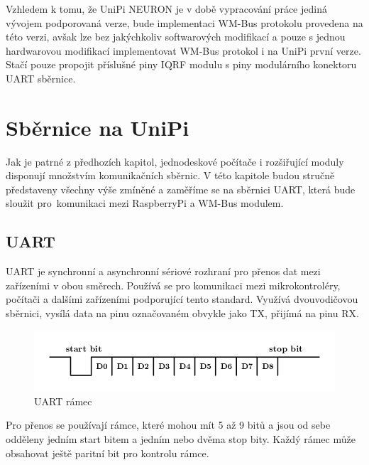 \vspace{10pt}
Vzhledem k tomu, že UniPi NEURON je v době vypracování práce jediná vývojem podporovaná verze, bude implementaci WM-Bus protokolu provedena na této verzi, avšak lze bez jakýchkoliv softwarových modifikací a pouze s jednou hardwarovou modifikací implementovat WM-Bus protokol i na UniPi první verze. Stačí pouze propojit příslušné piny IQRF modulu s piny modulárního konektoru UART sběrnice.



\section{Sběrnice na UniPi}
Jak je patrné z předhozích kapitol, jednodeskové počítače i rozšiřující moduly disponují množstvím komunikačních sběrnic. V této kapitole budou stručně představeny všechny výše zmíněné a zaměříme se na sběrnici UART, která bude sloužit pro~komunikaci mezi RaspberryPi a WM-Bus modulem.

\subsection{UART}
UART je synchronní a asynchronní sériové rozhraní pro přenos dat mezi zařízeními v obou směrech. Používá se pro komunikaci mezi mikrokontroléry, počítači a dalšími zařízeními podporující tento standard. Využívá dvouvodičovou sběrnici, vysílá data na pinu označovaném obvykle jako TX, přijímá na pinu RX.

 \begin{figure}[!ht]
	\vspace{-10pt}
  \begin{center}
    \includegraphics[scale=1.0]{obrazky/sbernice_uart}
  \end{center}
	\vspace{-30pt}
  \caption{UART rámec}
	\vspace{-5pt}
\end{figure}
Pro přenos se používají rámce, které mohou mít 5 až 9 bitů a jsou od sebe odděleny jedním start bitem a jedním nebo dvěma stop bity. Každý rámec může obsahovat ještě paritní bit pro kontrolu rámce. 

